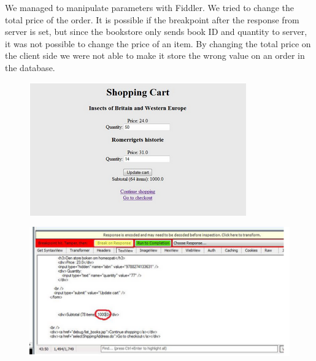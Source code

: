 We managed to manipulate parameters with Fiddler. We tried to change the total price of the order. It is possible if the breakpoint after the response from server is set, but since the bookstore only sends book ID and quantity to server, it was not possible to change the price of an item. By changing the total price on the client side we were not able to make it store the wrong value on an order in the database.

\begin{figure}[!ht]
	\includegraphics[scale=0.8]{pics/testtest2.png}
\end{figure}

\begin{figure}[!ht]
	\includegraphics[scale=0.8]{pics/testtest.png}
\end{figure}
